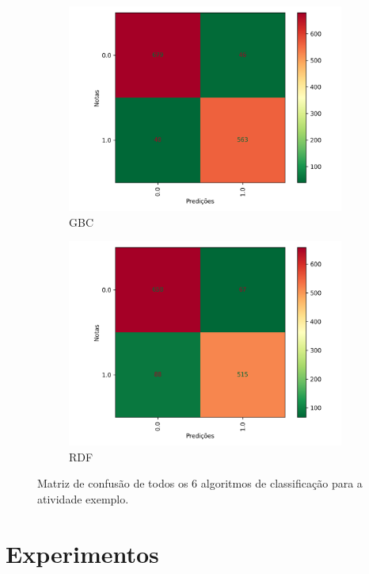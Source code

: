 \begin{figure}[!h]
\begin{subfigure}{0.4\textwidth}
 \includegraphics[width=\textwidth]{figuras/exemplo/sandstone-cmGBC.png}
 \caption{GBC}
\end{subfigure}
\hfill
\begin{subfigure}{0.4\textwidth}
 \centering
 \includegraphics[width=\textwidth]{figuras/exemplo/sandstone-cmRDF.png}
 \caption{RDF}
\end{subfigure}
\caption{Matriz de confusão de todos os 6 algoritmos de classificação para a atividade exemplo.}
\label{fig-exemplo-cm}
\end{figure}


\chapter{Experimentos}

